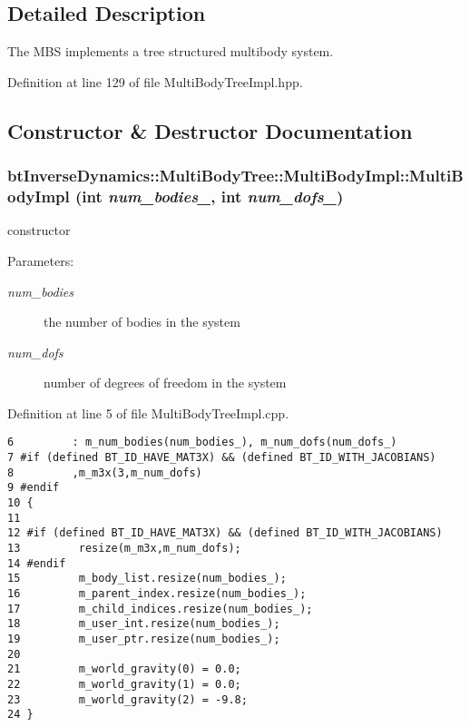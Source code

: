 \subsection{Detailed Description}
The MBS implements a tree structured multibody system. 

Definition at line 129 of file MultiBodyTreeImpl.hpp.

\subsection{Constructor \& Destructor Documentation}
\hypertarget{classbt_inverse_dynamics_1_1_multi_body_tree_1_1_multi_body_impl_1451e035a52b67c1804d7dd0dd799af2}{
\subsubsection[MultiBodyImpl]{\setlength{\rightskip}{0pt plus 5cm}btInverseDynamics::MultiBodyTree::MultiBodyImpl::MultiBodyImpl (int {\em num\_\-bodies\_\-}, \/  int {\em num\_\-dofs\_\-})}}
\label{classbt_inverse_dynamics_1_1_multi_body_tree_1_1_multi_body_impl_1451e035a52b67c1804d7dd0dd799af2}


constructor \begin{Desc}
\item[Parameters:]
\begin{description}
\item[{\em num\_\-bodies}]the number of bodies in the system \item[{\em num\_\-dofs}]number of degrees of freedom in the system \end{description}
\end{Desc}


Definition at line 5 of file MultiBodyTreeImpl.cpp.

\begin{Code}\begin{verbatim}6         : m_num_bodies(num_bodies_), m_num_dofs(num_dofs_)
7 #if (defined BT_ID_HAVE_MAT3X) && (defined BT_ID_WITH_JACOBIANS)
8         ,m_m3x(3,m_num_dofs)
9 #endif
10 {
11 
12 #if (defined BT_ID_HAVE_MAT3X) && (defined BT_ID_WITH_JACOBIANS)
13         resize(m_m3x,m_num_dofs);
14 #endif
15         m_body_list.resize(num_bodies_);
16         m_parent_index.resize(num_bodies_);
17         m_child_indices.resize(num_bodies_);
18         m_user_int.resize(num_bodies_);
19         m_user_ptr.resize(num_bodies_);
20 
21         m_world_gravity(0) = 0.0;
22         m_world_gravity(1) = 0.0;
23         m_world_gravity(2) = -9.8;
24 }
\end{verbatim}
\end{Code}




